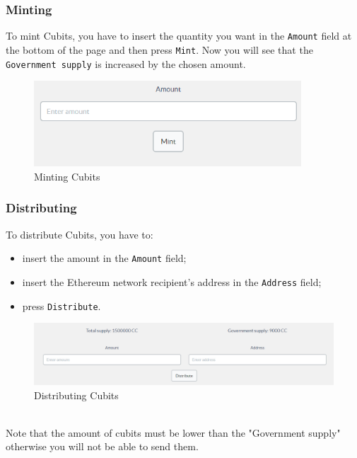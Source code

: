 		\subsubsection{Minting}
		To mint Cubits\glo{}, you have to insert the quantity you want in the 
		\texttt{Amount} field at the bottom of the page and then press \texttt{Mint}. Now you will 
		see that the \texttt{Government supply} is increased by the chosen amount.
		\begin{figure}[H]
			\includegraphics[width=10cm]{res/images/minting_cubits.png}
			\centering
			\caption{Minting Cubits}
		\end{figure}
		\subsubsection{Distributing}
		To distribute Cubits\glo{}, you have to:
		\begin{itemize}
			\item insert the amount in the \texttt{Amount} field;
			\item insert the Ethereum\glo{} network recipient's address in the \texttt{Address} field;
			\item press \texttt{Distribute}.
		\end{itemize}		   

		\begin{figure}[H]
			\includegraphics[width=15cm]{res/images/distribute_cubit.png}
			\centering
			\caption{Distributing Cubits}
		\end{figure} \mbox{}\\
		\noindent Note that the amount of cubits must be lower than the "Government  
		supply" otherwise you will not be able to send them.
